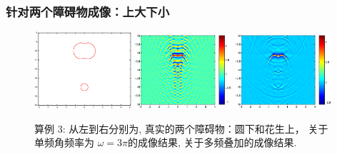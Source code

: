 \documentclass[8pt]{beamer}
\newcommand{\om}{\omega}
\begin{document}
\begin{frame}
\frametitle{针对两个障碍物成像：上大下小}
\begin{figure}[h]
	
		\centering
	\includegraphics[width=0.32\textwidth,height=0.33\textheight]{./graphic/circle_0_4_peanut_1_profile_reverse.eps}
	\includegraphics[width=0.32\textwidth]{./graphic/circle_0_4_peanut_1_3pi_down.eps}
	\includegraphics[width=0.32\textwidth]{./graphic/circle_0_4_peanut_1_multi_down.eps}
	
	\caption{算例 3: 从左到右分别为,  真实的两个障碍物：圆下和花生上， 关于单频角频率为 $\om=3\pi$的成像结果, 关于多频叠加的成像结果.}
\end{figure}
\end{frame}
\end{document}
